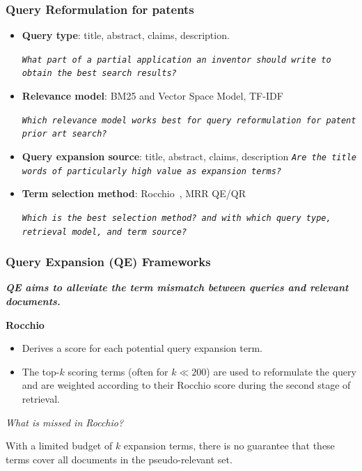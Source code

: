 \documentclass[xcolor=x11names,compress]{beamer}
\renewcommand{\(}{\begin{columns}}
\renewcommand{\)}{\end{columns}}
\newcommand{\<}[1]{\begin{column}{#1}}
\renewcommand{\>}{\end{column}}
\begin{document}
\begin{frame}
\frametitle{Query Reformulation for patents}

\begin{itemize}
\item {\color{DeepSkyBlue4}\textbf{Query type}}: title, abstract, claims, description.

{\small \textit{\texttt{What part of a partial application an inventor
should write to obtain the best search results?}}}

\item {\color{DeepSkyBlue4}\textbf{Relevance model}}: BM25 and Vector Space Model, TF-IDF~\citep{Salton1975}

{\small \textit{\texttt{Which relevance model works best for query reformulation
for patent prior art search? }}}

\item {\color{DeepSkyBlue4}\textbf{Query expansion source}}:  title, abstract,
claims, description
{\small \texttt{\textit{Are the title words of particularly high value as expansion terms? }}}

\item {\color{DeepSkyBlue4}\textbf{Term selection method}}: Rocchio~\citep{Salton1971}, 
MRR QE/QR 

{\small \textit{\texttt{Which is the best selection method? and with which query type, retrieval model, and term source? }}}
\end{itemize}
\end{frame}


\begin{frame}
\frametitle{Query Expansion (QE) Frameworks}

{\color{DeepSkyBlue4}\textit{\textbf{QE aims to alleviate the term mismatch between queries and relevant documents.}}}

\vspace{0.3cm}

\textbf{Rocchio}~\citep{Salton1971}

\begin{itemize}
\item Derives a score for each potential query expansion term.
\item The top-$k$ scoring terms (often for $k\ll200$) are used to reformulate the query and are
weighted according to their Rocchio score during the second stage
of retrieval.
\end{itemize}

{\color{DeepSkyBlue4}\textit{What is missed in Rocchio?}}

\vspace{0.3cm}
With a limited budget of $k$ expansion terms, there is no guarantee that these terms cover all documents in the pseudo-relevant set.
\end{frame}
\end{document}
